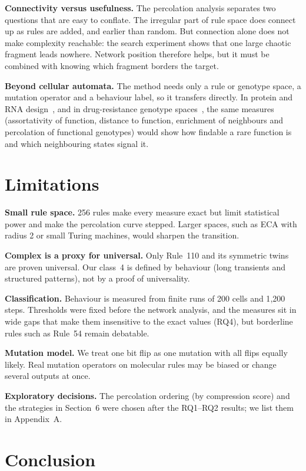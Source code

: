 \documentclass[10pt,letterpaper,twocolumn]{article}
\newcommand{\para}[1]{\textbf{#1}\hspace{0.4em}}
\begin{document}
\para{Connectivity versus usefulness.} The percolation analysis separates two questions that are easy to conflate. The irregular part of rule space does connect up as rules are added, and earlier than random. But connection alone does not make complexity reachable: the search experiment shows that one large chaotic fragment leads nowhere. Network position therefore helps, but it must be combined with knowing which fragment borders the target.

\para{Beyond cellular automata.} The method needs only a rule or genotype space, a mutation operator and a behaviour label, so it transfers directly. In protein and RNA design~\cite{schuster1994}, and in drug-resistance genotype spaces~\cite{weinreich2006}, the same measures (assortativity of function, distance to function, enrichment of neighbours and percolation of functional genotypes) would show how findable a rare function is and which neighbouring states signal it.

\section{Limitations}

\para{Small rule space.} 256 rules make every measure exact but limit statistical power and make the percolation curve stepped. Larger spaces, such as ECA with radius 2 or small Turing machines, would sharpen the transition.

\para{Complex is a proxy for universal.} Only Rule~110 and its symmetric twins are proven universal. Our class~4 is defined by behaviour (long transients and structured patterns), not by a proof of universality.

\para{Classification.} Behaviour is measured from finite runs of 200 cells and 1{,}200 steps. Thresholds were fixed before the network analysis, and the measures sit in wide gaps that make them insensitive to the exact values (RQ4), but borderline rules such as Rule~54 remain debatable.

\para{Mutation model.} We treat one bit flip as one mutation with all flips equally likely. Real mutation operators on molecular rules may be biased or change several outputs at once.

\para{Exploratory decisions.} The percolation ordering (by compression score) and the strategies in Section~6 were chosen after the RQ1--RQ2 results; we list them in Appendix~A.

\section{Conclusion}
\end{document}
